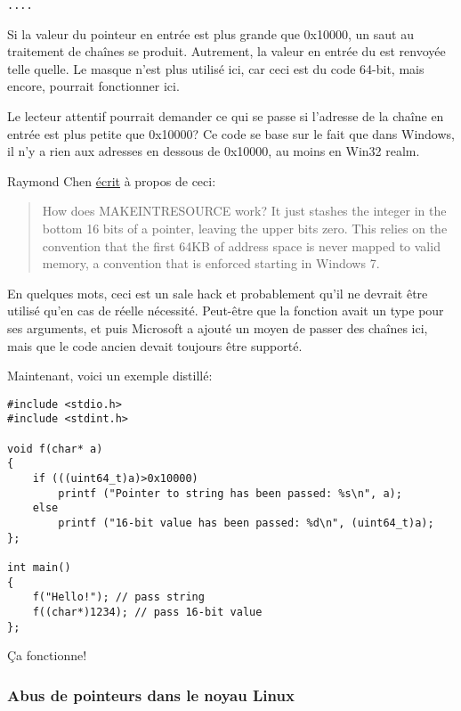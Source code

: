 \begin{lstlisting}[style=customasmx86]
....

\end{lstlisting}

Si la valeur du pointeur en entrée est plus grande que 0x10000, un saut au traitement
de chaînes se produit.
Autrement, la valeur en entrée du  est renvoyée telle quelle.
Le masque  n'est plus utilisé ici, car ceci est du code 64-bit, mais
encore,  pourrait fonctionner ici.

Le lecteur attentif pourrait demander ce qui se passe si l'adresse de la chaîne en
entrée est plus petite que 0x10000?
Ce code se base sur le fait que dans Windows, il n'y a rien aux adresses en dessous
de 0x10000, au moins en Win32 realm.

Raymond Chen \href{https://blogs.msdn.microsoft.com/oldnewthing/20130925-00/?p=3123}{écrit} à propos de ceci:

\begin{framed}
\begin{quotation}
How does MAKE­INT­RESOURCE work? It just stashes the integer in the bottom 16 bits of a pointer, leaving the upper bits zero. This relies on the convention that the first 64KB of address space is never mapped to valid memory, a convention that is enforced starting in Windows 7.
\end{quotation}
\end{framed}

En quelques mots, ceci est un sale hack et probablement qu'il ne devrait être utilisé
qu'en cas de réelle nécessité.
Peut-être que la fonction  avait un type  pour ses arguments,
et puis Microsoft a ajouté un moyen de passer des chaînes ici, mais que le code ancien
devait toujours être supporté.

Maintenant, voici un exemple distillé:

\begin{lstlisting}[style=customc]
#include <stdio.h>
#include <stdint.h>

void f(char* a)
{
	if (((uint64_t)a)>0x10000)
		printf ("Pointer to string has been passed: %s\n", a);
	else
		printf ("16-bit value has been passed: %d\n", (uint64_t)a);
};

int main()
{
	f("Hello!"); // pass string
	f((char*)1234); // pass 16-bit value
};
\end{lstlisting}

Ça fonctionne!

\subsubsection{Abus de pointeurs dans le noyau Linux}

